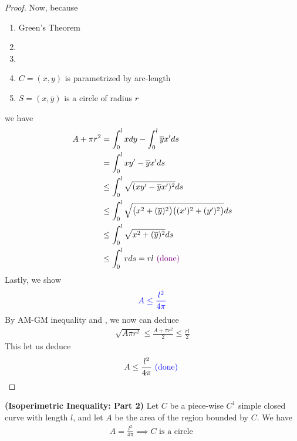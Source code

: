 \documentclass{report}
\begin{document}
\begin{proof}
Now, because 
\begin{enumerate}[label=(\alph*)]
  \item Green's Theorem
  \item {}
  \item {}
  \item $C=(x,y)$ is parametrized by arc-length
  \item $S=(x,\overline{y})$ is a circle of radius $r$ 
\end{enumerate}
we have
\begin{align}
A+ \pi r^2 &= \int_0^l xdy -\int_0^l \overline{y}x'ds\notag\\
&=\int_0^l xy'-\overline{y}x'ds\notag\\
&\leq \int_0^l \sqrt{(xy'-\overline{y}x')^2}\notag ds\\
&\leq \int_0^l \sqrt{\big(x^2+(\overline{y})^2 \big)\big((x')^2+(y')^2 \big)}\notag ds \\
&\leq \int_0^l \sqrt{x^2+(\overline{y})^2}ds\notag \\
&\leq \int_0^l rds =rl \textcolor{violet}{\text{ (done) }} \label{A+pi}
\end{align}
Lastly, we show 
\begin{align*}
  \textcolor{blue}{A\leq \frac{l^2}{4\pi}}
\end{align*}
By AM-GM inequality and , we now can deduce
\begin{align}
\label{AM}
  \sqrt{A\pi r^2}\leq \frac{A+\pi r^2}{2}\leq \frac{rl}{2}
\end{align}
This let us deduce 
\begin{align*}
A\leq \frac{l^2}{4\pi}\textcolor{blue}{\text{ (done) }}
\end{align*}
\end{proof}
\begin{theorem}
\textbf{(Isoperimetric Inequality: Part 2)} Let $C$ be a piece-wise $C^1$ simple closed curve with length  $l$, and let  $A$ be the area of the region bounded by  $C$. We have 
\begin{align*}
A=\frac{l^2}{4\pi}\implies C\text{ is a circle }
\end{align*}
\end{theorem}
\end{document}
